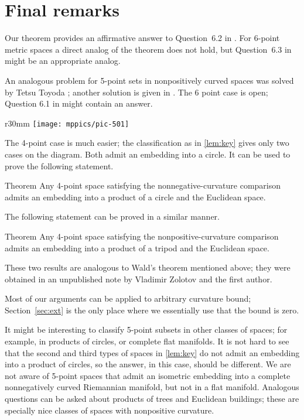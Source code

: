 \documentclass{article}
\begin{document}
\section{Final remarks}

Our theorem provides an affirmative answer to Question~6.2 in \cite{lebedeva-petrunin}.
For 6-point metric spaces a direct analog of the theorem does not hold,
but Question~6.3 in \cite{lebedeva-petrunin} might be an appropriate analog.

An analogous problem for 5-point sets in nonpositively curved spaces was solved by Tetsu Toyoda \cite{toyoda}; another solution is given in \cite{lebedeva-petrunin}.
The 6 point case is open;
Question 6.1 in \cite{lebedeva-petrunin} might contain an answer.

{

\begin{wrapfigure}{r}{30mm}
\vskip-6mm
\centering
\texttt{[image: mppics/pic-501]}
\end{wrapfigure}

The 4-point case is much easier;
the classification as in \ref{lem:key} gives only two cases on the diagram.
Both admit an embedding into a circle.
It can be used to prove the following statement.

}

\begin{thm}{Theorem}
Any 4-point space satisfying the nonnegative-curvature comparison
admits an embedding into a product of a circle and the Euclidean space.
\end{thm}

The following statement can be proved in a similar manner.

\begin{thm}{Theorem} Any 4-point space satisfying the nonpositive-curvature comparison admits an embedding into a product of a tripod and the Euclidean space.
\end{thm}

These two results are analogous to Wald's theorem mentioned above;
they were obtained in an unpublished note by Vladimir Zolotov and the first author.

\medskip

Most of our arguments can be applied to arbitrary curvature bound;
Section~\ref{sec:ext} is the only place where we essentially use that the bound is zero.

It might be interesting to classify 5-point subsets in other classes of spaces;
for example, in products of circles, or complete flat manifolds.
It is not hard to see that the second and third types of spaces in \ref{lem:key} do not admit an embedding into a product of circles, so the answer, in this case, should be different.
We are not aware of 5-point spaces that admit an isometric embedding into a complete nonnegatively curved Riemannian manifold, but not in a flat manifold.
Analogous questions can be asked about products of trees and Euclidean buildings;
these are specially nice classes of spaces with nonpositive curvature.
\end{document}
